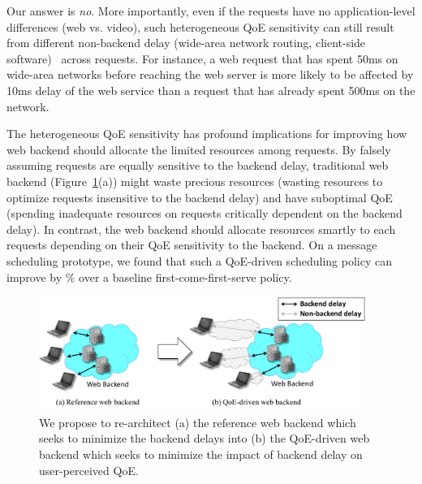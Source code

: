 Our answer is {\em no}.  More importantly, even if the requests have no application-level differences (\eg web vs. video), such heterogeneous QoE sensitivity can still result from different non-backend delay (\eg wide-area network routing, client-side software)~\cite{timecard,dqbarge} across requests.
For instance, a web request that has spent 50ms on wide-area networks before reaching the web server is more likely to be affected by 10ms delay of the web service than a request that has already spent 500ms on the network. 

The heterogeneous QoE sensitivity has profound implications for improving how web backend should allocate the limited resources among requests. 
By falsely assuming requests are equally sensitive to the backend delay, traditional web backend (Figure~\ref{fig:intro-overview}(a)) might waste precious resources (\eg wasting resources to optimize requests insensitive to the backend delay) and have suboptimal QoE (\eg spending inadequate resources on requests critically dependent on the backend delay). 
In contrast, the web backend should allocate resources smartly to each requests depending on their QoE sensitivity to the backend. 
On a message scheduling prototype, we found that such a QoE-driven scheduling policy can improve \fillme by \fillme\% over a baseline first-come-first-serve policy.

\begin{figure}[t]
	\centering
	\vspace{-0.5cm}
	\hspace{0.6cm}
	\includegraphics[width=0.95\textwidth]{figs/intro-overview.pdf}
	\vspace{-0.3cm}
	\caption{We propose to re-architect (a) the reference web backend which seeks to minimize the backend delays into (b) the QoE-driven web backend which seeks to minimize the impact of backend delay on user-perceived QoE.}
	\label{fig:intro-overview}
\end{figure}

